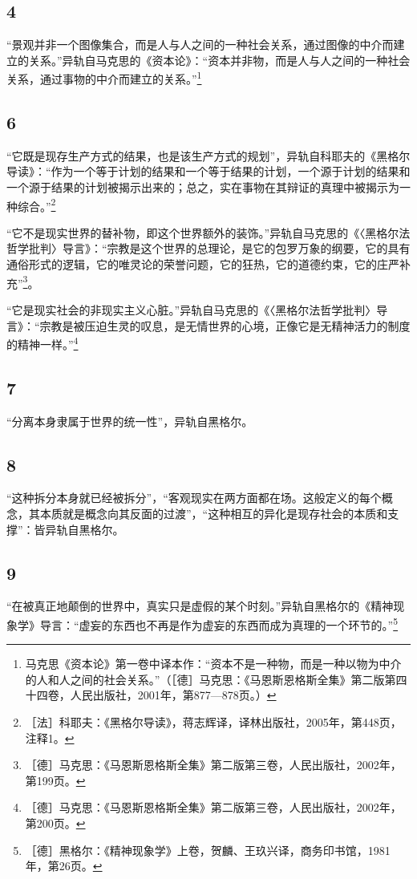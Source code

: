 \documentclass[fontset=fandol, a4paper, 12pt, openright]{ctexbook}
\begin{document}
\subsection*{4}
“景观并非一个图像集合，而是人与人之间的一种社会关系，通过图像的中介而建立的关系。”异轨自马克思的《资本论》：“资本并非物，而是人与人之间的一种社会关系，通过事物的中介而建立的关系。”\footnote{马克思《资本论》第一卷中译本作：“资本不是一种物，而是一种以物为中介的人和人之间的社会关系。”（［德］马克思：《马恩斯恩格斯全集》第二版第四十四卷，人民出版社，2001年，第877—878页。）}

\subsection*{6}
“它既是现存生产方式的结果，也是该生产方式的规划”，异轨自科耶夫的《黑格尔导读》：“作为一个等于计划的结果和一个等于结果的计划，一个源于计划的结果和一个源于结果的计划被揭示出来的；总之，实在事物在其辩证的真理中被揭示为一种综合。”\footnote{［法］科耶夫：《黑格尔导读》，蒋志辉译，译林出版社，2005年，第448页，注释1。}

“它不是现实世界的替补物，即这个世界额外的装饰。”异轨自马克思的《〈黑格尔法哲学批判〉导言》：“宗教是这个世界的总理论，是它的包罗万象的纲要，它的具有通俗形式的逻辑，它的唯灵论的荣誉问题，它的狂热，它的道德约束，它的庄严补充”\footnote{［德］马克思：《马恩斯恩格斯全集》第二版第三卷，人民出版社，2002年，第199页。}。

“它是现实社会的非现实主义心脏。”异轨自马克思的《〈黑格尔法哲学批判〉导言》：“宗教是被压迫生灵的叹息，是无情世界的心境，正像它是无精神活力的制度的精神一样。”\footnote{［德］马克思：《马恩斯恩格斯全集》第二版第三卷，人民出版社，2002年，第200页。}

\subsection*{7}
“分离本身隶属于世界的统一性”，异轨自黑格尔。

\subsection*{8}
“这种拆分本身就已经被拆分”，“客观现实在两方面都在场。这般定义的每个概念，其本质就是概念向其反面的过渡”，“这种相互的异化是现存社会的本质和支撑”：皆异轨自黑格尔。

\subsection*{9}
“在被真正地颠倒的世界中，真实只是虚假的某个时刻。”异轨自黑格尔的《精神现象学》导言：“虚妄的东西也不再是作为虚妄的东西而成为真理的一个环节的。”\footnote{［德］黑格尔：《精神现象学》上卷，贺麟、王玖兴译，商务印书馆，1981年，第26页。}
\end{document}
